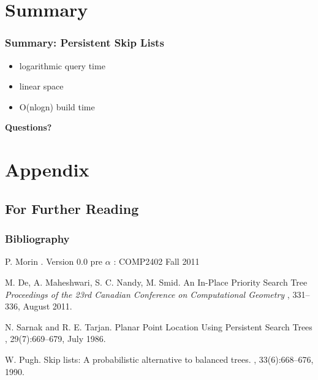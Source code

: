 \documentclass{beamer}
\begin{document}
\section*{Summary}

\begin{frame}
  \frametitle<presentation>{Summary: Persistent Skip Lists}

  \begin{center}
    \begin{itemize}
    \item
      \alert{logarithmic} query time
    \item
      \alert{linear} space
    \item
      \alert{O(nlogn)} build time
    \end{itemize}
  \end{center}

\end{frame}

\begin{frame}
  \begin{center}
    {\bf Questions?}
  \end{center}
\end{frame}

\appendix
\section*{Appendix}

\subsection*{For Further Reading}

\begin{frame}
  \frametitle<presentation>{Bibliography}

  \begin{thebibliography}{10}
    
  \beamertemplatebookbibitems

    P. Morin
    .
    \newblock Version 0.0 pre $\alpha$ : COMP2402 Fall 2011
    
  \beamertemplatearticlebibitems

    M. De, A. Maheshwari, S. C. Nandy, M. Smid.
    \newblock An In-Place Priority Search Tree
    \newblock
    {
      \em Proceedings of the 23rd Canadian Conference on Computational Geometry
    },
    331--336, August 2011.

    N. Sarnak and R. E. Tarjan.
    \newblock Planar Point Location Using Persistent Search Trees
    ,
    29(7):669--679, July 1986.

    W. Pugh.
    \newblock Skip lists: A probabilistic alternative to balanced trees.
    ,
    33(6):668--676, 1990.

  \end{thebibliography}
\end{frame}
\end{document}
